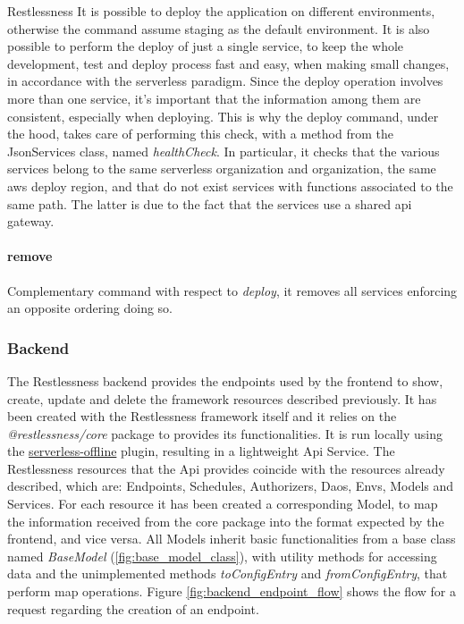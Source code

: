 \begin{chapter}{Restlessness}
    It is possible to deploy the application on different environments, otherwise
    the command assume staging as the default environment.
    It is also possible to perform the deploy of just a single service, to keep
    the whole development, test and deploy process fast and easy, when making small
    changes, in accordance with the serverless paradigm.
    Since the deploy operation involves more than one service, it's important that
    the information among them are consistent, especially when deploying. This is
    why the deploy command, under the hood, takes care of performing this check,
    with a method from the JsonServices class, named \textit{healthCheck}.
    In particular, it checks that the various services belong to the same serverless
    organization and organization, the same aws deploy region, and that do not exist
    services with functions associated to the same path. The latter is due to the fact
    that the services use a shared api gateway.

    \paragraph{remove}
    Complementary command with respect to \textit{deploy}, it removes all services
    enforcing an opposite ordering doing so.

    \subsubsection{Backend}
    The Restlessness backend provides the endpoints used by the frontend to show,
    create, update and delete the framework resources described previously.
    It has been created with the Restlessness framework itself and it relies on
    the \mbox{\textit{@restlessness/core}} package to provides its functionalities.
    It is run locally using the
    \href{https://www.npmjs.com/package/serverless-offline}{serverless-offline}
    plugin, resulting in a lightweight Api Service.
    The Restlessness resources that the Api provides coincide with the resources
    already described, which are: Endpoints, Schedules, Authorizers, Daos, Envs,
    Models and Services.
    For each resource it has been created a corresponding Model, to map the information
    received from the core package into the format expected by the frontend, and
    vice versa. All Models inherit basic functionalities from a base class named
    \textit{BaseModel} (\ref{fig:base_model_class}), with utility methods for
    accessing data and the unimplemented methods \textit{toConfigEntry} and
    \textit{fromConfigEntry}, that perform map operations.
    Figure \ref{fig:backend_endpoint_flow} shows the flow for a request regarding
    the creation of an endpoint.


\end{chapter}
